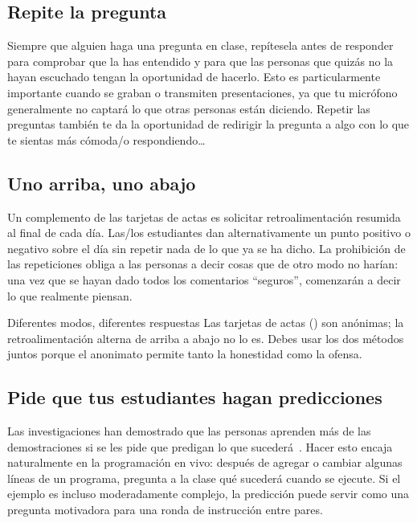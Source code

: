 \subsection*{Repite la pregunta}

Siempre que alguien haga una pregunta en clase,
repítesela antes de responder
para comprobar que la has entendido
y para que las personas que quizás no la hayan escuchado tengan la oportunidad de hacerlo.
Esto es particularmente importante cuando se graban o transmiten presentaciones,
ya que tu micrófono generalmente no captará lo que otras personas están diciendo. Repetir las preguntas también te da la oportunidad
de redirigir la pregunta a algo con lo que te sientas más cómoda/o respondiendo{\ldots}

\subsection*{Uno arriba, uno abajo}

Un complemento de las tarjetas de actas es solicitar retroalimentación resumida al final de cada día.
Las/los estudiantes dan alternativamente un punto positivo o negativo sobre el día
sin repetir nada de lo que ya se ha dicho.
La prohibición de las repeticiones obliga a las personas a decir cosas que de otro modo no harían:
una vez que se hayan dado todos los comentarios ``seguros'',
comenzarán a decir lo que realmente piensan.

\begin{aside}{Diferentes modos, diferentes respuestas}
  Las tarjetas de actas () son anónimas;
  la retroalimentación alterna de arriba a abajo no lo es.
  Debes usar los dos métodos juntos
  porque el anonimato permite tanto la honestidad como la ofensa.
\end{aside}

\subsection*{Pide que tus estudiantes hagan predicciones}

Las investigaciones han demostrado que las personas aprenden más de las demostraciones
si se les pide que predigan lo que sucederá~\cite{Mill2013}.
Hacer esto encaja naturalmente en la programación en vivo:
después de agregar o cambiar algunas líneas de un programa,
pregunta a la clase qué sucederá cuando se ejecute.
Si el ejemplo es incluso moderadamente complejo,
la predicción puede servir como una pregunta motivadora para una ronda de instrucción entre pares.

